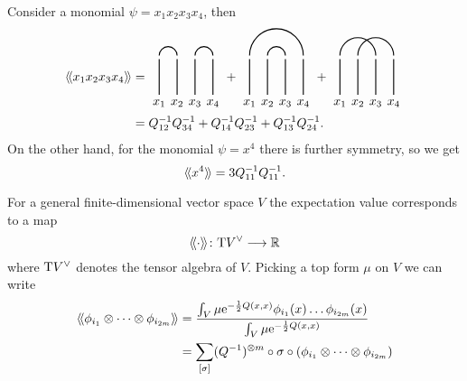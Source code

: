 \begin{example}
  Consider a monomial $\psi = x_1 x_2 x_3 x_4$, then
  \begin{align*}
    \avg{x_1 x_2 x_3 x_4}
    &= 
    \begin{tikzpicture}[scale=.5, baseline=4mm]
      \draw[thick] (0, 0) node[anchor=north] {$x_1$} -- (0, 2);
      \draw[thick] (1, 0) node[anchor=north] {$x_2$}-- (1, 2);
      \draw[thick] (2, 0) node[anchor=north] {$x_3$} -- (2, 2);
      \draw[thick] (3, 0) node[anchor=north] {$x_4$} -- (3, 2);
      \draw[thick] (0, 2.2) arc (180:0:.5);
      \draw[thick] (2, 2.2) arc (180:0:.5);
    \end{tikzpicture}
    +
    \begin{tikzpicture}[scale=.5, baseline=4mm]
      \draw[thick] (0, 0) node[anchor=north] {$x_1$} -- (0, 2);
      \draw[thick] (1, 0) node[anchor=north] {$x_2$}-- (1, 2);
      \draw[thick] (2, 0) node[anchor=north] {$x_3$} -- (2, 2);
      \draw[thick] (3, 0) node[anchor=north] {$x_4$} -- (3, 2);
      \draw[thick] (0, 2.2) arc (180:0:1.5);
      \draw[thick] (1, 2.2) arc (180:0:.5);
    \end{tikzpicture}
    +
    \begin{tikzpicture}[scale=.5, baseline=4mm]
      \draw[thick] (0, 0) node[anchor=north] {$x_1$} -- (0, 2);
      \draw[thick] (1, 0) node[anchor=north] {$x_2$}-- (1, 2);
      \draw[thick] (2, 0) node[anchor=north] {$x_3$} -- (2, 2);
      \draw[thick] (3, 0) node[anchor=north] {$x_4$} -- (3, 2);
      \draw[thick] (0, 2.2) arc (180:0:1);
      \draw[thick] (1, 2.2) arc (180:0:1);
    \end{tikzpicture} \\
    &= Q_{12}^{-1} Q_{34}^{-1} + Q_{14}^{-1} Q_{23}^{-1} + Q_{13}^{-1} Q_{24}^{-1}.
  \end{align*}
  On the other hand, for the monomial $\psi = x^4$ there is further symmetry, so we get
  \begin{equation*}
    \langle \! \langle {x^4} \rangle \! \rangle = 3 Q_{11}^{-1} Q_{11}^{-1}.
  \end{equation*}
\end{example}

For a general finite-dimensional vector space $V$ the expectation value corresponds to a map
\begin{equation*}
  \langle \! \langle {\cdot} \rangle \! \rangle \colon \mathrm{T} V^\vee \longrightarrow \mathbb{R}
\end{equation*}
where $\mathrm{T} V^\vee$ denotes the tensor algebra of $V$. Picking a top form $\mu$ on $V$ we can write
\begin{align*}
  \langle \! \langle {\phi_{i_1} \otimes \dots \otimes \phi_{i_{2m}}} \rangle \! \rangle
  &= \frac{
    \int_V \mu \mathrm{e}^{-\frac{1}{2} Q(x, x)} \phi_{i_1}(x) \dots \phi_{i_{2m}}(x)
  }{
    \int_V \mu \mathrm{e}^{-\frac{1}{2} Q(x, x)}
  } \\
  &= \sum_{[\sigma]} (Q^{-1})^{\otimes m} \circ \sigma \circ (\phi_{i_1} \otimes \dots \otimes \phi_{i_{2m}})
\end{align*}

